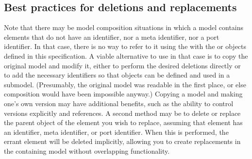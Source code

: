 



\subsection{Best practices for deletions and replacements}
\label{best-practices-deletions}
\label{best-practices-replacements}

Note that there may be model composition situations in which a model
contains elements that do not have an identifier, nor a meta identifier,
nor a port identifier.  In that case, there is no way to refer to it
using the with the \Deletion or \ReplacedElement objects defined in this specification.  A viable alternative to use in
that case is to copy the original model and modify it, either to perform
the desired deletions directly or to add the necessary identifiers so
that \Deletion objects can be defined and used in a submodel.
(Presumably, the original model was readable in the first place, or else
composition would have been impossible anyway.)  Copying a model and
making one's own version may have additional benefits, such as the
ability to control versions explicitly and references.  A second method may be to delete or replace the parent object of the element you wish to replace, assuming that element has an identifier, meta identifier, or port identifier.  When this is performed, the errant element will be deleted implicitly, allowing you to create replacements in the containing model without overlapping functionality.

